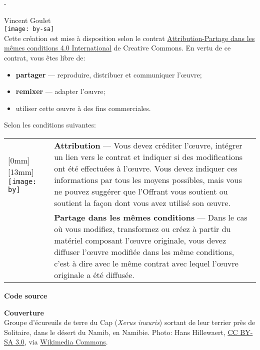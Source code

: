\begingroup
\calccentering{\unitlength}
\begin{adjustwidth*}{\unitlength}{-\unitlength}
  \setlength{\parindent}{0pt}
  \setlength{\parskip}{\baselineskip}
  \small

  {\textcopyright} {\year} Vincent Goulet \\

  \texttt{[image: by-sa]}\\%
  Cette création est mise à disposition selon le contrat
  \href{http://creativecommons.org/licenses/by-sa/4.0/deed.fr}{%
    Attribution-Partage dans les mêmes conditions 4.0 International} de
  Creative Commons. En vertu de ce contrat, vous êtes libre de:
  \begin{itemize}
  \item \textbf{partager} --- reproduire, distribuer et communiquer
    l'{\oe}uvre;
  \item \textbf{remixer} --- adapter l'{\oe}uvre;
  \item utiliser cette {\oe}uvre à des fins commerciales.
  \end{itemize}
  Selon les conditions suivantes:

  \begin{tabularx}{\linewidth}{@{}lX@{}}
    \raisebox{-9mm}[0mm][13mm]{%
      \texttt{[image: by]}} &
    \textbf{Attribution} --- Vous devez créditer l'{\oe}uvre, intégrer
    un lien vers le contrat et indiquer si des modifications ont été
    effectuées à l'{\oe}uvre. Vous devez indiquer ces informations par
    tous les moyens possibles, mais vous ne pouvez suggérer que
    l'Offrant vous soutient ou soutient la façon dont vous avez utilisé
    son {\oe}uvre. \\
    \raisebox{-9mm}{\texttt{[image: sa]}}
    & \textbf{Partage dans les mêmes conditions} --- Dans le cas où vous
    modifiez, transformez ou créez à partir du matériel composant
    l'{\oe}uvre originale, vous devez diffuser l'{\oe}uvre modifiée dans
    les même conditions, c'est à dire avec le même contrat avec lequel
    l'{\oe}uvre originale a été diffusée.
  \end{tabularx}

  \textbf{Code source} \\
  \viewsource{\reposurl}



  \textbf{Couverture} \\
  Groupe d'écureuils de terre du Cap (\emph{Xerus inauris}) sortant de
  leur terrier près de Solitaire, dans le désert du Namib, en Namibie.
  Photo: {\textcopyright} Hans Hillewaert, \href{http://creativecommons.org/licenses/by-sa/3.0/deed.fr}{CC BY-SA 3.0}, via
  \href{https://commons.wikimedia.org/w/index.php?curid=2429056}{Wikimedia Commons}.
\end{adjustwidth*}
\endgroup

